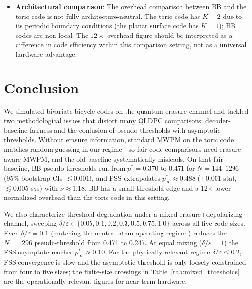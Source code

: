 \documentclass[a4paper]{quantumarticle}
\begin{document}
\begin{itemize}
          the per-size crossings $p^*(N)$ plateau: $p^*(900) \approx p^*(1296)$ to three
          decimal places at both $\delta/\varepsilon = 0.05$ and $0.2$, preventing reliable
          power-law FSS extrapolation.
          The $\delta/\varepsilon = 0.1$ fit has $\nu$ at the upper search bound and a
          bootstrap CI spanning $[0.29, 0.48]$; the $\delta/\varepsilon = 0.05$ fit is
          entirely underdetermined (chi-squared $> 300$) and is omitted from Table~\ref{tab:mixed_fss}.
          Larger code sizes ($N \gg 1296$) or a data-collapse analysis using
          the full WER curves would be needed to sharpen these estimates.
          We report finite-size crossings as the primary result in this regime.
    \item \textbf{Architectural comparison}: The overhead comparison between BB and the toric
          code is not fully architecture-neutral. The toric code has $K=2$ due to its periodic
          boundary conditions (the planar surface code has $K=1$); BB codes are non-local.
          The $12\times$ overhead
          figure should be interpreted as a difference in code efficiency within this
          comparison setting, not as a universal hardware advantage.
\end{itemize}

\section{Conclusion}

We simulated bivariate bicycle codes on the quantum erasure channel and tackled two
methodological issues that distort many QLDPC comparisons: decoder-baseline fairness and
the confusion of pseudo-thresholds with asymptotic thresholds.
Without erasure information, standard MWPM on the toric code matches random guessing in
our regime---so fair code comparisons need erasure-aware MWPM, and the old baseline
systematically misleads.
On that fair baseline, BB pseudo-thresholds run from $p^* = 0.370$ to $0.471$ for
$N = 144$--$1296$ (95\% bootstrap CIs $\lesssim 0.001$), and FSS extrapolates
$p^*_\infty \approx 0.488$ ($\pm 0.001$ stat, $\lesssim 0.005$ sys) with $\nu \approx 1.18$.
BB has a small threshold edge and a 12$\times$ lower normalized overhead than the toric
code in this setting.

We also characterize threshold degradation under a mixed erasure+depolarizing channel,
sweeping $\delta/\varepsilon \in \{0.05, 0.1, 0.2, 0.3, 0.5, 0.75, 1.0\}$ across all five
code sizes.
Even $\delta/\varepsilon = 0.1$ (matching the neutral-atom operating regime
\cite{sahay2023highthreshold}) reduces the $N = 1296$ pseudo-threshold from 0.471 to 0.247.
At equal mixing ($\delta/\varepsilon = 1$) the FSS asymptote reaches $p^*_\infty \approx 0.10$.
For the physically relevant regime $\delta/\varepsilon \leq 0.2$, FSS convergence is
slow and the asymptotic threshold is only loosely constrained from four to five sizes; the
finite-size crossings in Table~\ref{tab:mixed_thresholds} are the operationally relevant
figures for near-term hardware.
\end{document}
